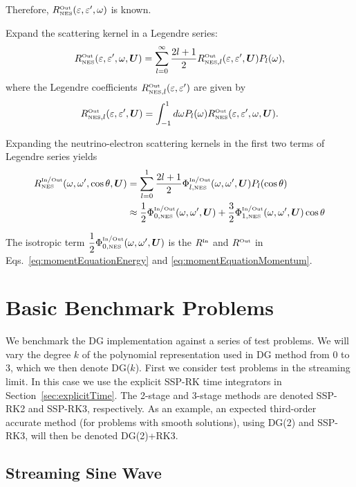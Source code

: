 \documentclass[10pt,preprint]{aastex}
\newcommand{\NES}{\mbox{\tiny NES}}
\begin{document}
Therefore, $R^{\Out}_{\NES}(\epsilonNu,\epsilonNu^\prime, \omega)$ is known. 
    
Expand the scattering kernel in a Legendre series:
\begin{align}
R^{\Out}_{\NES}(\epsilonNu,\epsilonNu^\prime, \omega, \bU) = \sum_{l=0}^{\infty} \dfrac{2l+1}{2} R^{\Out}_{{\NES}, l}(\epsilonNu,\epsilonNu^\prime, \bU) P_l(\omega),
\end{align}
where the Legendre coefficients $R^{\Out}_{{\NES}, l}(\epsilonNu,\epsilonNu^\prime)$ are given by
\begin{align}
R^{\Out}_{{\NES}, l}(\epsilonNu,\epsilonNu^\prime, \bU) = \int_{-1}^{1} d\omega P_l(\omega) R^{\Out}_{\NES}(\epsilonNu,\epsilonNu^\prime, \omega, \bU).
\end{align}
   
Expanding the neutrino-electron scattering kernels in the first two terms of Legendre series yields
\begin{align}
R^{\In/\Out}_{\NES}(\omega, \omega^{\prime}, \cos\theta, \bU) & = \sum_{l=0}^{1} \dfrac{ 2l+1}{2}\Phi^{\In/\Out}_{l,\NES}(\omega,\omega^{\prime},\bU)P_l(\cos\theta) \\
& \approx \dfrac{1}{2}\Phi_{0,\NES}^{\In/\Out}(\omega,\omega^{\prime}, \bU) + \dfrac{3}{2}\Phi^{\In/\Out}_{1,\NES}(\omega,\omega^{\prime}, \bU)\cos\theta
\end{align}

The isotropic term $\dfrac{1}{2}\Phi_{0,\NES}^{\In/\Out}(\omega,\omega^{\prime}, \bU)$ is the $R^{\mbox{\tiny In}}$ and $R^{\mbox{\tiny Out}}$  in Eqs.~\eqref{eq:momentEquationEnergy} and \eqref{eq:momentEquationMomentum}. 

\section{Basic Benchmark Problems}

We benchmark the DG implementation against a series of test problems.  
We will vary the degree $k$ of the polynomial representation used in DG method from 0 to 3, which we then denote DG($k$).  
First we consider test problems in the streaming limit.  
In this case we use the explicit SSP-RK time integrators in Section~\ref{sec:explicitTime}.  
The 2-stage and 3-stage methods are denoted SSP-RK2 and SSP-RK3, respectively.  
As an example, an expected third-order accurate method (for problems with smooth solutions), using DG(2) and SSP-RK3, will then be denoted DG(2)+RK3.  

\subsection{Streaming Sine Wave}
\end{document}

